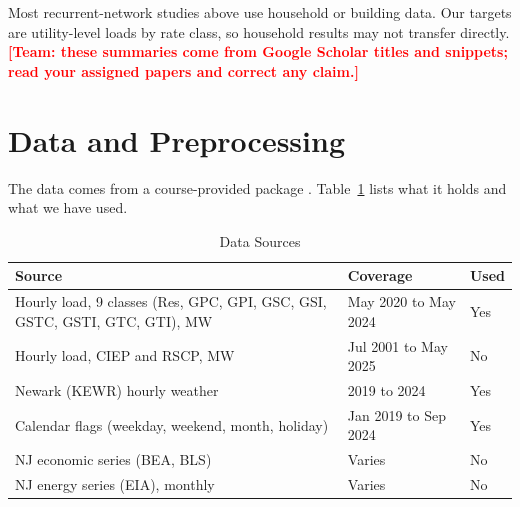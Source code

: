 \documentclass[10pt,letterpaper,twocolumn]{article}
\newcommand{\todo}[1]{\textcolor{red}{\textbf{[Team: #1]}}}
\begin{document}
Most recurrent-network studies above use household or building data. Our targets are utility-level loads by rate class, so household results may not transfer directly. \todo{these summaries come from Google Scholar titles and snippets; read your assigned papers and correct any claim.}

\section{Data and Preprocessing}
The data comes from a course-provided package \cite{course}. Table~\ref{tab:data} lists what it holds and what we have used.

\begin{table}[t]
\caption{Data Sources}
\label{tab:data}
\centering\footnotesize
\setlength{\tabcolsep}{3pt}
\begin{tabular}{@{}p{1.55in}p{1.0in}p{0.55in}@{}}
\toprule
Source & Coverage & Used \\
\midrule
Hourly load, 9 classes (Res, GPC, GPI, GSC, GSI, GSTC, GSTI, GTC, GTI), MW & May 2020 to May 2024 & Yes \\
Hourly load, CIEP and RSCP, MW & Jul 2001 to May 2025 & No \\
Newark (KEWR) hourly weather & 2019 to 2024 & Yes \\
Calendar flags (weekday, weekend, month, holiday) & Jan 2019 to Sep 2024 & Yes \\
NJ economic series (BEA, BLS) & Varies & No \\
NJ energy series (EIA), monthly & Varies & No \\
\bottomrule
\end{tabular}
\end{table}
\end{document}
